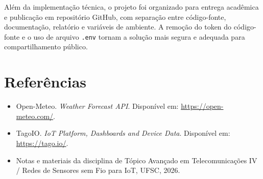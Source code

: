 \documentclass[12pt,a4paper]{article}
\begin{document}
Além da implementação técnica, o projeto foi organizado para entrega acadêmica e publicação em repositório GitHub, com separação entre código-fonte, documentação, relatório e variáveis de ambiente. A remoção do token do código-fonte e o uso de arquivo \texttt{.env} tornam a solução mais segura e adequada para compartilhamento público.

\section*{Referências}

\begin{itemize}
    \item Open-Meteo. \textit{Weather Forecast API}. Disponível em: \url{https://open-meteo.com/}.
    \item TagoIO. \textit{IoT Platform, Dashboards and Device Data}. Disponível em: \url{https://tago.io/}.
    \item Notas e materiais da disciplina de Tópico Avançado em Telecomunicações IV / Redes de Sensores sem Fio para IoT, UFSC, 2026.
\end{itemize}
\end{document}
